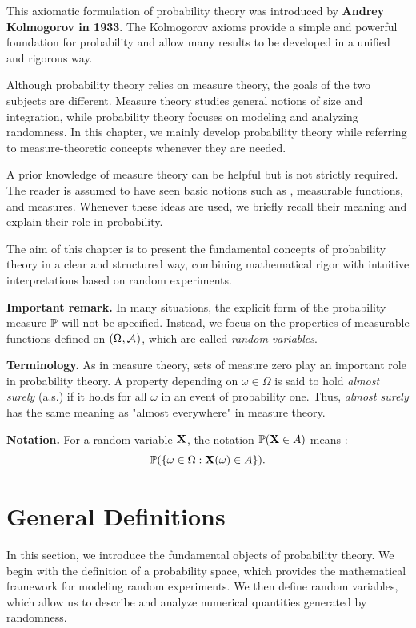\documentclass[../Main.tex]{subfiles}
\begin{document}
This axiomatic formulation of probability theory was introduced by \textbf{Andrey Kolmogorov in 1933}. The Kolmogorov axioms provide a simple and powerful foundation for probability and allow many results to be developed in a unified and rigorous way.

Although probability theory relies on measure theory, the goals of the two subjects are different. Measure theory studies general notions of size and integration, while probability theory focuses on modeling and analyzing randomness. In this chapter, we mainly develop probability theory while referring to measure-theoretic concepts whenever they are needed.

A prior knowledge of measure theory can be helpful but is not strictly required. The reader is assumed to have seen basic notions such as \sfields, measurable functions, and measures. Whenever these ideas are used, we briefly recall their meaning and explain their role in probability.

The aim of this chapter is to present the fundamental concepts of probability theory in a clear and structured way, combining mathematical rigor with intuitive interpretations based on random experiments.

\medskip
\textbf{Important remark.}
In many situations, the explicit form of the probability measure $\mathbb{P}$ will not be specified. Instead, we focus on the properties of measurable functions defined on $(\Omega_{}, \mathcal{A}_{})$, which are called \emph{random variables}.

\medskip
\textbf{Terminology.}
As in measure theory, sets of measure zero play an important role in probability theory.  A property depending on $\omega \in \Omega$ is said to hold \emph{almost surely} (a.s.) if it holds for all $\omega$ in an event of probability one. Thus, \textit{almost surely} has the same meaning as "almost everywhere" in measure theory.

\medskip
\textbf{Notation.}
For a random variable $\mathbf{X}$, the notation $\mathbb{P}(\mathbf{X} \in A)$ means :
\[ \mathbb{P}(\{\omega \in \Omega : \mathbf{X}(\omega) \in A\}). \]
\newpage


\section{General Definitions}
In this section, we introduce the fundamental objects of probability theory. We begin with the definition of a probability space, which provides the mathematical framework for modeling random experiments. We then define random variables, which allow us to describe and analyze numerical quantities generated by randomness.
\end{document}
